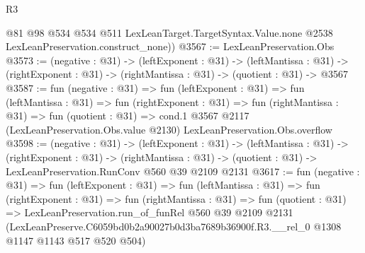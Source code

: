 \begin{lexlean}{R3}
\begin{coremodule}
        @81
        @98
        @534
        @534
        @511
        LexLeanTarget.TargetSyntax.Value.none
        @2538
        LexLeanPreservation.construct_none))
@3567 := LexLeanPreservation.Obs
@3573 := (negative : @31) ->
  (leftExponent : @31) ->
  (leftMantissa : @31) ->
  (rightExponent : @31) -> (rightMantissa : @31) -> (quotient : @31) -> @3567
@3587 := fun (negative : @31) =>
  fun (leftExponent : @31) =>
  fun (leftMantissa : @31) =>
  fun (rightExponent : @31) =>
  fun (rightMantissa : @31) =>
  fun (quotient : @31) =>
  cond.{1} @3567 @2117 (LexLeanPreservation.Obs.value @2130) LexLeanPreservation.Obs.overflow
@3598 := (negative : @31) ->
  (leftExponent : @31) ->
  (leftMantissa : @31) ->
  (rightExponent : @31) ->
  (rightMantissa : @31) -> (quotient : @31) -> LexLeanPreservation.RunConv @560 @39 @2109 @2131
@3617 := fun (negative : @31) =>
  fun (leftExponent : @31) =>
  fun (leftMantissa : @31) =>
  fun (rightExponent : @31) =>
  fun (rightMantissa : @31) =>
  fun (quotient : @31) =>
  LexLeanPreservation.run_of_funRel
    @560
    @39
    @2109
    @2131
    (LexLeanPreserve.C6059bd0b2a90027b0d3ba7689b36900f.R3.__rel_0 @1308 @1147 @1143 @517 @520 @504)
\end{coremodule}
\end{lexlean}
